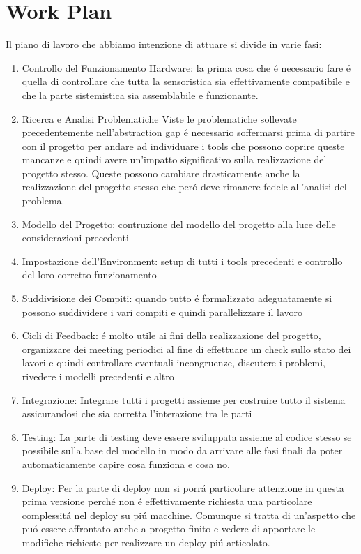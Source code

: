 \section{Work Plan}

Il piano di lavoro che abbiamo intenzione di attuare si divide in varie fasi:

\begin{enumerate}
  \item{Controllo del Funzionamento Hardware:} la prima cosa che \'e necessario fare \'e quella di controllare che tutta la sensoristica sia effettivamente compatibile e che la parte sistemistica sia assemblabile e funzionante.
  \item{Ricerca e Analisi Problematiche} Viste le problematiche sollevate precedentemente nell'abstraction gap \'e necessario soffermarsi prima di partire con il progetto per andare ad individuare i tools che possono coprire queste mancanze e quindi avere un'impatto significativo sulla realizzazione del progetto stesso. Queste possono cambiare drasticamente anche la realizzazione del progetto stesso che per\'o deve rimanere fedele all'analisi del problema.
  \item{Modello del Progetto:} contruzione del modello del progetto alla luce delle considerazioni precedenti
  \item{Impostazione dell'Environment:} setup di tutti i tools precedenti e controllo del loro corretto funzionamento
  \item{Suddivisione dei Compiti:} quando tutto \'e formalizzato adeguatamente si possono suddividere i vari compiti e quindi parallelizzare il lavoro
  \item{Cicli di Feedback:} \'e molto utile ai fini della realizzazione del progetto, organizzare dei meeting periodici al fine di effettuare un check sullo stato dei lavori e quindi controllare eventuali incongruenze, discutere i problemi, rivedere i modelli precedenti e altro
  \item{Integrazione:} Integrare tutti i progetti assieme per costruire tutto il sistema assicurandosi che sia corretta l'interazione tra le parti
  \item{Testing:} La parte di testing deve essere sviluppata assieme al codice stesso se possibile sulla base del modello in modo da arrivare alle fasi finali da poter automaticamente capire cosa funziona e cosa no.
  \item{Deploy:} Per la parte di deploy non si porr\'a particolare attenzione in questa prima versione perch\'e non \'e effettivamente richiesta una particolare complessit\'a nel deploy su pi\'u macchine. Comunque si tratta di un'aspetto che pu\'o essere affrontato anche a progetto finito e vedere di apportare le modifiche richieste per realizzare un deploy pi\'u articolato.
\end{enumerate}

